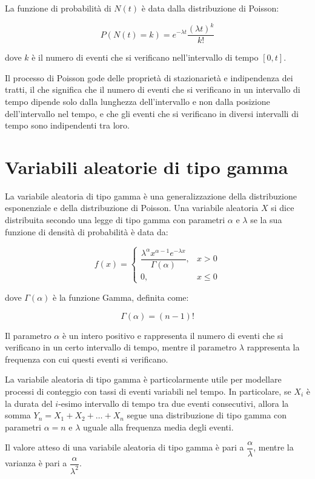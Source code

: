 La funzione di probabilità di $N(t)$ è data dalla distribuzione di Poisson:

$$ P(N(t) = k) = e^{-\lambda t} \frac{(\lambda t)^k}{k!} $$

dove $k$ è il numero di eventi che si verificano nell'intervallo di tempo $[0,t]$.

Il processo di Poisson gode delle proprietà di stazionarietà e indipendenza dei tratti, il che significa che il numero di eventi che si verificano in un intervallo di tempo dipende solo dalla lunghezza dell'intervallo e non dalla posizione dell'intervallo nel tempo, e che gli eventi che si verificano in diversi intervalli di tempo sono indipendenti tra loro.

\section{Variabili aleatorie di tipo gamma}
La variabile aleatoria di tipo gamma è una generalizzazione della distribuzione esponenziale e della distribuzione di Poisson. Una variabile aleatoria $X$ si dice distribuita secondo una legge di tipo gamma con parametri $\alpha$ e $\lambda$ se la sua funzione di densità di probabilità è data da:

$$f(x) = \begin{cases}
\dfrac{\lambda^{\alpha}x^{\alpha-1}e^{-\lambda x}}{\Gamma(\alpha)}, & x > 0 \\
0, & x \leq 0
\end{cases}$$

dove $\Gamma(\alpha)$ è la funzione Gamma, definita come:

$$\Gamma(\alpha) = (n - 1)!$$

Il parametro $\alpha$ è un intero positivo e rappresenta il numero di eventi che si verificano in un certo intervallo di tempo, mentre il parametro $\lambda$ rappresenta la frequenza con cui questi eventi si verificano.

La variabile aleatoria di tipo gamma è particolarmente utile per modellare processi di conteggio con tassi di eventi variabili nel tempo. In particolare, se $X_i$ è la durata del $i$-esimo intervallo di tempo tra due eventi consecutivi, allora la somma $Y_n = X_1 + X_2 + \dots + X_n$ segue una distribuzione di tipo gamma con parametri $\alpha=n$ e $\lambda$ uguale alla frequenza media degli eventi. 

Il valore atteso di una variabile aleatoria di tipo gamma è pari a $\dfrac{\alpha}{\lambda}$, mentre la varianza è pari a $\dfrac{\alpha}{\lambda^2}$.

